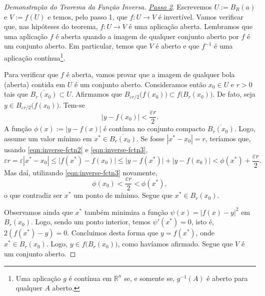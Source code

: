 \begin{proof}[Demonstração do Teorema da Função Inversa]
	
	\smallskip
	
	\underline{\textit{Passo 2}}. Escrevemos $U := B_R(a)$ e $V := f(U)$ e temos, pelo passo 1, que $f:U \to V$ é invertível. Vamos verificar que, nas hipóteses do teorema, $f: U \to V$ é uma aplicação aberta. Lembramos que uma aplicação $f$ é aberta quando a imagem de qualquer conjunto aberto por $f$ é um conjunto aberto. Em particular, temos que $V$ é aberto e que $f^{-1}$ é uma aplicação contínua\footnote{Uma aplicação $g$ é contínua em $\mathbb{R}^n$ se, e somente se, $g^{-1}(A)$ é aberto para qualquer $A$ aberto.}.
	
	Para verificar que $f$ é aberta, vamos provar que a imagem de qualquer bola (aberta) contida em $U$ é um conjunto aberto. Consideramos então $x_0 \in U$ e $r > 0$ tais que $\overline{B_r(x_0)} \subset U$. Afirmamos que $B_{\varepsilon r/2} \big(f(x_0)\big) \subset f\big(B_r(x_0)\big)$. De fato, seja $y \in B_{\varepsilon r/2} \big(f(x_0)\big)$. Tem-se
	\begin{equation}\label{eqn:inverse-fctn3}
	\big| y - f(x_0) \big| < \frac{\varepsilon r}{2}.
	\end{equation} A função $\phi(x) := |y - f(x)|$ é contínua no conjunto compacto $\overline{B_r(x_0)}$. Logo, assume um valor mínimo em $x^* \in \overline{B_r(x_0)}$. Se fosse $|x^* - x_0| = r$, teríamos que, usando \eqref{eqn:inverse-fctn2} e \eqref{eqn:inverse-fctn3},
	\[
	\varepsilon r = \varepsilon |x^* - x_0| \le \big| f(x^*) - f(x_0)\big| \le \big| y - f(x^*)\big| + \big| y - f(x_0)\big| < \phi(x^*) + \frac{\varepsilon r}{2}.
	\] Mas daí, utilizando \eqref{eqn:inverse-fctn3} novamente,
	\[
	\phi(x_0) < \frac{\varepsilon r}{2} < \phi(x^*), 
	\] o que contradiz ser $x^*$ um ponto de mínimo. Segue que $x^* \in B_r(x_0)$.
	
	Observamos ainda que $x^*$ também minimiza a função $\psi(x) = |f(x) - y|^2$ em $\overline{B_r(x_0)}$. Logo, sendo um ponto interior, temos $\psi'(x^*) = 0$, isto é, $2(f(x^*) - y) = 0$. Concluimos desta forma que $y = f(x^*)$, onde $x^* \in B_r(x_0)$. Logo, $y \in f\big(B_r(x_0)\big)$, como havíamos afirmado. Segue que $V$ é um conjunto aberto.
	
	\smallskip
	

\end{proof}
